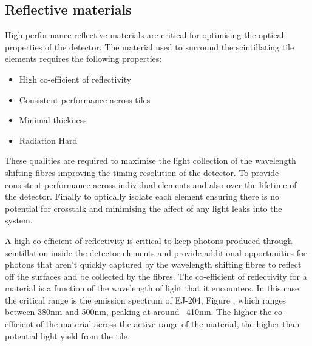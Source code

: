 %
%
%


\subsection{Reflective materials}

High performance reflective materials are critical for optimising the optical properties of the detector. The material used to surround the scintillating tile elements requires the following properties:
\begin{itemize}
	\item High co-efficient of reflectivity  
	\item Consistent performance across tiles
	\item Minimal thickness
	\item Radiation Hard
\end{itemize}

These qualities are required to maximise the light collection of the wavelength shifting fibres improving the timing resolution of the detector. To provide consistent performance across individual elements and also over the lifetime of the detector. Finally to optically isolate each element ensuring there is no potential for crosstalk and minimising the affect of any light leaks into the system.

A high co-efficient of reflectivity is critical to keep photons produced through scintillation inside the detector elements and provide additional opportunities for photons that aren't quickly captured by the wavelength shifting fibres to reflect off the surfaces and be collected by the fibres. The co-efficient of reflectivity for a material is a function of the wavelength of light that it encounters. In this case the critical range is the emission spectrum of EJ-204, Figure , which ranges between 380nm and 500nm, peaking at around ~410nm. The higher the co-efficient of the material across the active range of the material, the higher than potential light yield from the tile.


